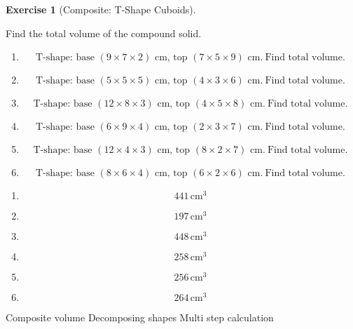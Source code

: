 \documentclass[
  letterpaper,
  DIV=11,
  numbers=noendperiod]{scrreprt}
\theoremstyle{definition}
\newtheorem{exercise}{Exercise}[chapter]
\theoremstyle{remark}
\begin{document}
\begin{exercise}[Composite: T-Shape
Cuboids]\protect\hypertarget{exr-comp-6}{}\label{exr-comp-6}

Find the total volume of the compound solid.

\begin{enumerate}
\def\labelenumi{\alph{enumi})}
\item
  \[\text{T-shape: base }(9\times7\times2)\text{ cm, top }(7\times5\times9)\text{ cm.}\ \text{Find total volume.}\]
\item
  \[\text{T-shape: base }(5\times5\times5)\text{ cm, top }(4\times3\times6)\text{ cm.}\ \text{Find total volume.}\]
\item
  \[\text{T-shape: base }(12\times8\times3)\text{ cm, top }(4\times5\times8)\text{ cm.}\ \text{Find total volume.}\]
\item
  \[\text{T-shape: base }(6\times9\times4)\text{ cm, top }(2\times3\times7)\text{ cm.}\ \text{Find total volume.}\]
\item
  \[\text{T-shape: base }(12\times4\times3)\text{ cm, top }(8\times2\times7)\text{ cm.}\ \text{Find total volume.}\]
\item
  \[\text{T-shape: base }(8\times6\times4)\text{ cm, top }(6\times2\times6)\text{ cm.}\ \text{Find total volume.}\]
\end{enumerate}

\begin{tcolorbox}[enhanced jigsaw, opacitybacktitle=0.6, coltitle=black, arc=.35mm, colframe=quarto-callout-tip-color-frame, colback=white, bottomrule=.15mm, left=2mm, colbacktitle=quarto-callout-tip-color!10!white, titlerule=0mm, opacityback=0, title=\textcolor{quarto-callout-tip-color}{\faLightbulb}\hspace{0.5em}{🔍 View Solution}, leftrule=.75mm, breakable, rightrule=.15mm, bottomtitle=1mm, toptitle=1mm, toprule=.15mm]

\begin{enumerate}
\def\labelenumi{\alph{enumi})}
\item
  \[441\,\text{cm}^{3}\]
\item
  \[197\,\text{cm}^{3}\]
\item
  \[448\,\text{cm}^{3}\]
\item
  \[258\,\text{cm}^{3}\]
\item
  \[256\,\text{cm}^{3}\]
\item
  \[264\,\text{cm}^{3}\]
\end{enumerate}

\end{tcolorbox}

{Composite volume} {Decomposing shapes} {Multi step calculation}

\end{exercise}
\end{document}
